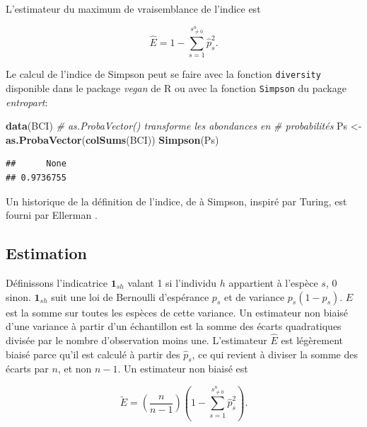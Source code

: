 \documentclass[
  11pt,
  french,
  a4paper,
  extrafontsizes,onecolumn,openright
  ]{memoir}
\newenvironment{Shaded}{\begin{snugshade}}{\end{snugshade}}
\newcommand{\CommentTok}[1]{\textcolor[rgb]{0.56,0.35,0.01}{\textit{#1}}}
\newcommand{\FunctionTok}[1]{\textcolor[rgb]{0.13,0.29,0.53}{\textbf{#1}}}
\newcommand{\NormalTok}[1]{#1}
\newcommand{\OtherTok}[1]{\textcolor[rgb]{0.56,0.35,0.01}{#1}}
\begin{document}
L'estimateur du maximum de vraisemblance de l'indice est

\begin{equation}
  \label{eq:EstEML}
  \hat{E} = 1-\sum^{s^{n}_{\ne 0}}_{s=1}{\hat{p}^2_s}.
\end{equation}

Le calcul de l'indice de Simpson peut se faire avec la fonction \texttt{diversity} disponible dans le package \emph{vegan} de R ou avec la fonction \texttt{Simpson} du package \emph{entropart}:

\scriptsize

\begin{Shaded}
\begin{Highlighting}[]
\FunctionTok{data}\NormalTok{(BCI)}
\CommentTok{\# as.ProbaVector() transforme les abondances en}
\CommentTok{\# probabilités}
\NormalTok{Ps }\OtherTok{\textless{}{-}} \FunctionTok{as.ProbaVector}\NormalTok{(}\FunctionTok{colSums}\NormalTok{(BCI))}
\FunctionTok{Simpson}\NormalTok{(Ps)}
\end{Highlighting}
\end{Shaded}

\begin{verbatim}
##      None 
## 0.9736755
\end{verbatim}

\normalsize

Un historique de la définition de l'indice, de \textcite{Gini1912} à Simpson, inspiré par Turing, est fourni par Ellerman \autocite*{Ellerman2013}.

\subsection{Estimation}\label{estimation}

Définissons l'indicatrice \({{\mathbf 1}}_{sh}\) valant 1 si l'individu \(h\) appartient à l'espèce \(s\), 0 sinon.
\({{\mathbf 1}}_{sh}\) suit une loi de Bernoulli d'espérance \(p_s\) et de variance \(p_s\left(1-p_s\right)\).
\(E\) est la somme sur toutes les espèces de cette variance.
Un estimateur non biaisé d'une variance à partir d'un échantillon est la somme des écarts quadratiques divisée par le nombre d'observation moins une.
L'estimateur \(\hat{E}\) est légèrement biaisé parce qu'il est calculé à partir des \({\hat{p}}_s\), ce qui revient à diviser la somme des écarts par \(n\), et non \(n-1\).
Un estimateur non biaisé est \autocite{Good1953,Lande1996}

\begin{equation} 
  \label{eq:BiaisSimpson}
  \tilde{E} = \left(\frac{n}{n-1}\right)\left(1-\sum^{s^{n}_{\ne 0}}_{s=1}{{\hat{p}}^2_s}\right).
\end{equation}
\end{document}

